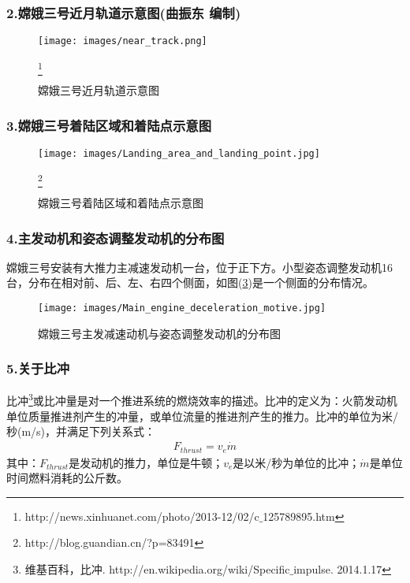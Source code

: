         \subsubsection{2.嫦娥三号近月轨道示意图(曲振东 编制)}
            \par
            \begin{figure}[H]
            \centering
            \texttt{[image: images/near\_track.png]}
            \caption{嫦娥三号近月轨道示意图}\footnote{http://news.xinhuanet.com/photo/2013-12/02/c$\_$125789895.htm}
            \label{fig:嫦娥三号近月轨道示意图}
            \end{figure}
        \subsubsection{3.嫦娥三号着陆区域和着陆点示意图}
            \par
            \begin{figure}[H]
            \centering
            \texttt{[image: images/Landing\_area\_and\_landing\_point.jpg]}
            \caption{嫦娥三号着陆区域和着陆点示意图}\footnote{http://blog.guandian.cn/?p=83491}
            \label{fig:嫦娥三号着陆区域和着陆点示意图}
            \end{figure}
        \subsubsection{4.主发动机和姿态调整发动机的分布图}
            \par
            嫦娥三号安装有大推力主减速发动机一台，位于正下方。小型姿态调整发动机16台，分布在相对前、后、左、右四个侧面，如图(\ref{fig:嫦娥三号主发减速动机与姿态调整发动机的分布图})是一个侧面的分布情况。
            \begin{figure}[H]
            \centering
            \texttt{[image: images/Main\_engine\_deceleration\_motive.jpg]}
            \caption{嫦娥三号主发减速动机与姿态调整发动机的分布图}
            \label{fig:嫦娥三号主发减速动机与姿态调整发动机的分布图}
            \end{figure}
        \subsubsection{5.关于比冲}
            \par
            比冲\footnote{维基百科，比冲. http://en.wikipedia.org/wiki/Specific$\_$impulse. 2014.1.17}或比冲量是对一个推进系统的燃烧效率的描述。比冲的定义为：火箭发动机单位质量推进剂产生的冲量，或单位流量的推进剂产生的推力。比冲的单位为米/秒(m/s)，并满足下列关系式：
            \begin{align*}
            F_{thrust} = v_e\dot{m}
            \end{align*}
            其中：$F_{thrust}$是发动机的推力，单位是牛顿；$v_e$是以米/秒为单位的比冲；$\dot{m}$是单位时间燃料消耗的公斤数。
